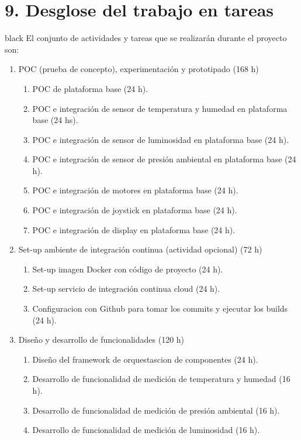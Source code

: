 \documentclass[
11pt, %
codirector, %
]{charter}
\begin{document}
\section{9. Desglose del trabajo en tareas}
\label{sec:wbs}

\begin{consigna}{black}
El conjunto de actividades y tareas que se realizarán durante el proyecto son:

\begin{enumerate}
\item POC (prueba de concepto), experimentación y prototipado (168 h)
	\begin{enumerate}
	\item POC de plataforma base (24 h).
	\item POC e integración de sensor de temperatura y humedad en plataforma base (24 hs).
	\item POC e integración de sensor de luminosidad en plataforma base (24 h).
	\item POC e integración de sensor de presión ambiental en plataforma base (24 h).
	\item POC e integración de motores en plataforma base (24 h).
	\item POC e integración de joystick en plataforma base (24 h).
	\item POC e integración de display en plataforma base (24 h).
	\end{enumerate}
\item Set-up ambiente de integración continua (actividad opcional) (72 h)
	\begin{enumerate}
	\item Set-up imagen Docker con código de proyecto (24 h).
	\item Set-up servicio de integración continua cloud (24 h).
	\item Configuracion con Github para tomar los commits y ejecutar los builds (24 h).
	\end{enumerate}
\item Diseño y desarrollo de funcionalidades (120 h)
	\begin{enumerate}
	\item Diseño del framework de orquestascion de componentes (24 h).
	\item Desarrollo de funcionalidad de medición de temperatura y humedad (16 h).
	\item Desarrollo de funcionalidad de medición de presión ambiental (16 h).
	\item Desarrollo de funcionalidad de medición de luminosidad (16 h).

\end{enumerate}
\end{enumerate}
\end{consigna}
\end{document}
